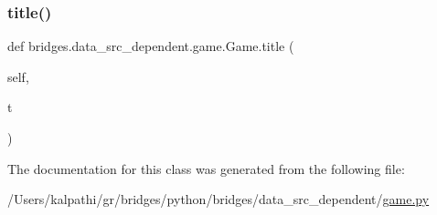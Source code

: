 \mbox{\label{classbridges_1_1data__src__dependent_1_1game_1_1_game_ae2b0f2f1bbbf2d11c669079b075c6ad1}} 
\subsubsection{\texorpdfstring{title()}{title()}\hspace{0.1cm}{\footnotesize\ttfamily [2/2]}}
{\footnotesize\ttfamily def bridges.\+data\+\_\+src\+\_\+dependent.\+game.\+Game.\+title (\begin{DoxyParamCaption}\item[{}]{self,  }\item[{}]{t }\end{DoxyParamCaption})}



The documentation for this class was generated from the following file\+:\begin{DoxyCompactItemize}
\item 
/\+Users/kalpathi/gr/bridges/python/bridges/data\+\_\+src\+\_\+dependent/\mbox{\hyperlink{game_8py}{game.\+py}}\end{DoxyCompactItemize}
